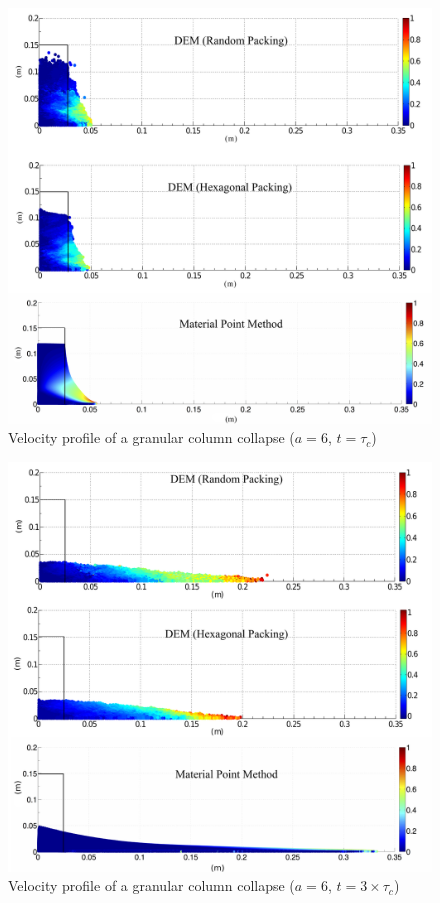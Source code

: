\begin{figure}[tbhp]
\centering
\includegraphics[width=\textwidth]{a6tc}
\caption{Velocity profile of a granular column collapse ($a = 6$,  
$t=\tau_c$)}
\label{fig:a6tc}
\end{figure}

\begin{figure}[tbhp]
\centering
\includegraphics[width=\textwidth]{a6f}
\caption{Velocity profile of a granular column collapse ($a = 6$, 
$t=3\times\tau_c$)}
\label{fig:a6f}
\end{figure}

